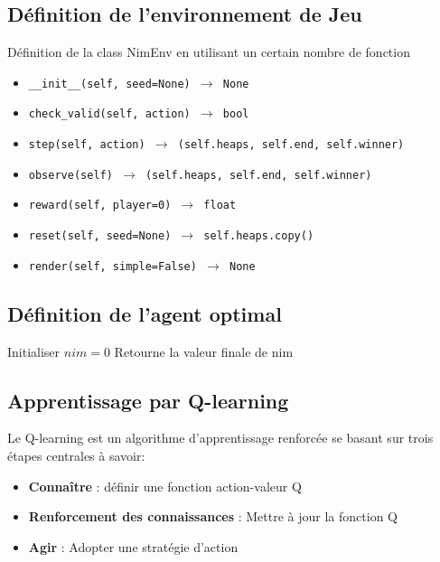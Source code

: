 \documentclass[ aspectratio=169]{beamer}
\begin{document}
\subsection{Définition de l'environnement de Jeu}
Définition de la class NimEnv en utilisant un certain nombre de fonction
\begin{itemize}
    \item \texttt{\_\_init\_\_(self, seed=None) $\rightarrow$ None}
    \item \texttt{check\_valid(self, action) $\rightarrow$ bool}
    \item \texttt{step(self, action) $\rightarrow$ (self.heaps, self.end, self.winner)}
    \item \texttt{observe(self) $\rightarrow$ (self.heaps, self.end, self.winner)}
    \item \texttt{reward(self, player=0) $\rightarrow$ float}
    \item \texttt{reset(self, seed=None) $\rightarrow$ self.heaps.copy()}
    \item \texttt{render(self, simple=False) $\rightarrow$ None}
\end{itemize}

\subsection{Définition de l'agent optimal}
		
		\begin{algorithm}
\caption{Algorithme somme digitale}
Initialiser $nim=0$ \;
	Retourne la valeur finale de nim
\end{algorithm}

\begin{frame}

\end{frame}

		\subsection {Apprentissage par Q-learning}
		\begin{frame}
		Le Q-learning est un algorithme d'apprentissage renforcée se basant sur trois étapes centrales à savoir: 
		\begin{itemize}
		\item \textbf{Connaître} : définir une fonction action-valeur Q
		\item \textbf{Renforcement des connaissances} : Mettre à jour la fonction Q
		\item \textbf{Agir} : Adopter une stratégie d'action 
		\end{itemize}
		\end{frame}
		
\end{document}
